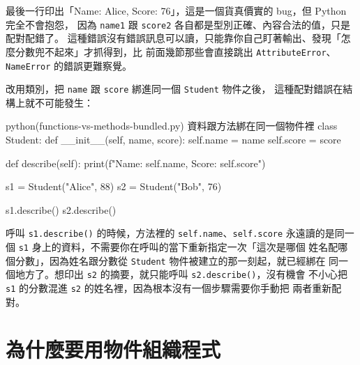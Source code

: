 
最後一行印出「Name: Alice, Score: 76」，這是一個貨真價實的 bug，但 Python 完全不會抱怨，
因為 \texttt{name1} 跟 \texttt{score2} 各自都是型別正確、內容合法的值，只是配對配錯了。
這種錯誤沒有錯誤訊息可以讀，只能靠你自己盯著輸出、發現「怎麼分數兜不起來」才抓得到，比
前面幾節那些會直接跳出 \texttt{AttributeError}、\texttt{NameError} 的錯誤更難察覺。

改用類別，把 \texttt{name} 跟 \texttt{score} 綁進同一個 \texttt{Student} 物件之後，
這種配對錯誤在結構上就不可能發生：

\begin{example}{python}{(functions-vs-methods-bundled.py) 資料跟方法綁在同一個物件裡}
class Student:
    def __init__(self, name, score):
        self.name = name
        self.score = score

    def describe(self):
        print(f"Name: {self.name}, Score: {self.score}")


s1 = Student("Alice", 88)
s2 = Student("Bob", 76)

s1.describe()
s2.describe()
\end{example}


呼叫 \texttt{s1.describe()} 的時候，方法裡的 \texttt{self.name}、\texttt{self.score}
永遠讀的是同一個 \texttt{s1} 身上的資料，不需要你在呼叫的當下重新指定一次「這次是哪個
姓名配哪個分數」，因為姓名跟分數從 \texttt{Student} 物件被建立的那一刻起，就已經綁在
同一個地方了。想印出 \texttt{s2} 的摘要，就只能呼叫 \texttt{s2.describe()}，沒有機會
不小心把 \texttt{s1} 的分數混進 \texttt{s2} 的姓名裡，因為根本沒有一個步驟需要你手動把
兩者重新配對。


\section{為什麼要用物件組織程式}
\label{sec:why-objects}

